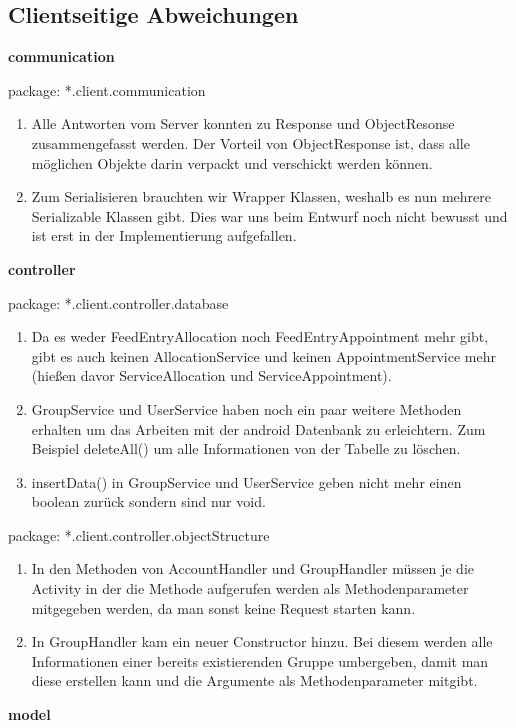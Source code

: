 \subsection{Clientseitige Abweichungen}

\textbf{communication}

package: *.client.communication
\begin{enumerate}
	\item Alle Antworten vom Server konnten zu Response und ObjectResonse zusammengefasst werden. Der Vorteil von ObjectResponse ist, dass alle möglichen Objekte darin verpackt und verschickt werden können.  
	\item Zum Serialisieren brauchten wir Wrapper Klassen, weshalb es nun mehrere Serializable Klassen gibt. Dies war uns beim Entwurf noch nicht bewusst und ist erst in der Implementierung aufgefallen.
\end{enumerate}
	
	
\textbf{controller}

package: *.client.controller.database
\begin{enumerate}
	\item Da es weder FeedEntryAllocation noch FeedEntryAppointment mehr gibt, gibt es auch keinen AllocationService und keinen AppointmentService mehr (hießen davor ServiceAllocation und ServiceAppointment).
	\item GroupService und UserService haben noch ein paar weitere Methoden erhalten um das Arbeiten mit der android Datenbank zu erleichtern. Zum Beispiel deleteAll() um alle Informationen von der Tabelle zu löschen.
	\item insertData() in GroupService und UserService geben nicht mehr einen boolean zurück sondern sind nur void. 
\end{enumerate}

package: *.client.controller.objectStructure
\begin{enumerate}
	\item In den Methoden von AccountHandler und GroupHandler müssen je die Activity in der die Methode aufgerufen werden als Methodenparameter mitgegeben werden, da man sonst keine Request starten kann.
	\item In GroupHandler kam ein neuer Constructor hinzu. Bei diesem werden alle Informationen einer bereits existierenden Gruppe umbergeben, damit man diese erstellen kann und die Argumente als Methodenparameter mitgibt.
\end{enumerate}


\textbf{model}

